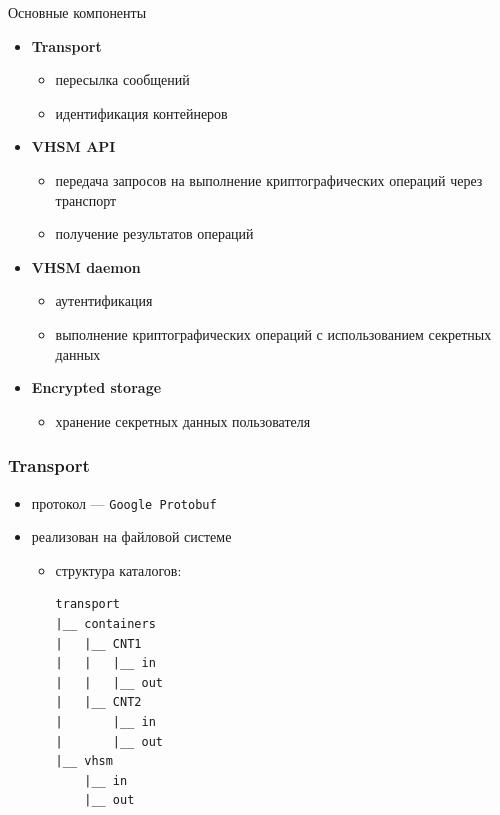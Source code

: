 \documentclass[utf8, 11pt]{beamer}
\begin{document}
\begin{frame}{Основные компоненты}
\begin{itemize}
\item {\bf Transport}
	\begin{itemize}
		\item пересылка сообщений
		\item идентификация контейнеров
	\end{itemize}
\item {\bf VHSM API}
	\begin{itemize}
		\item передача запросов на выполнение криптографических операций через транспорт
		\item получение результатов операций
	\end{itemize}
\item {\bf VHSM daemon}
	\begin{itemize}
		\item аутентификация
		\item выполнение криптографических операций с использованием секретных данных
	\end{itemize}
\item {\bf Encrypted storage}
	\begin{itemize}
		\item хранение секретных данных пользователя
	\end{itemize}
\end{itemize}

\end{frame}

\begin{frame}[fragile]
\frametitle{Transport}
\begin{itemize}
\item протокол --- \texttt{Google Protobuf}
\item реализован на файловой системе
	\begin{itemize}
	\item структура каталогов:
\begin{lstlisting}
transport
|__ containers
|   |__ CNT1
|   |   |__ in
|   |   |__ out
|   |__ CNT2
|       |__ in
|       |__ out
|__ vhsm
    |__ in
    |__ out
\end{lstlisting}
	\end{itemize}
\end{itemize}
\end{frame}
\end{document}
